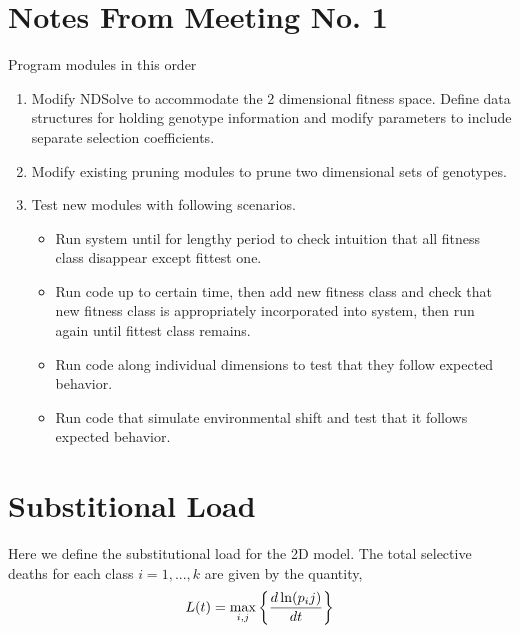 \documentclass{article}
\begin{document}
\section*{Notes From Meeting No. 1}
Program modules in this order
\begin{enumerate}
\item{Modify NDSolve to accommodate the 2 dimensional fitness space.  Define data structures for holding genotype information and modify parameters to include separate selection coefficients.}
\item{Modify existing pruning modules to prune two dimensional sets of genotypes.}
\item{Test new modules with following scenarios.}
\begin{itemize}
\item{Run system until for lengthy period to check intuition that all fitness class disappear except fittest one.}
\item{Run code up to certain time, then add new fitness class and check that new fitness class is appropriately incorporated into system, then run again until fittest class remains.}
\item{Run code along individual dimensions to test that they follow expected behavior.}
\item{Run code that simulate environmental shift and test that it follows expected behavior.}
\end{itemize}
\end{enumerate}

\section{Substitional Load}
Here we define the substitutional load for the 2D model.  The total selective deaths for each class $i=1,...,k$ are given by the quantity,
\[
L(t)=\max_{i,j}\left \{ d \ln(p_ij) \over dt \right \}
\]



\end{document}
